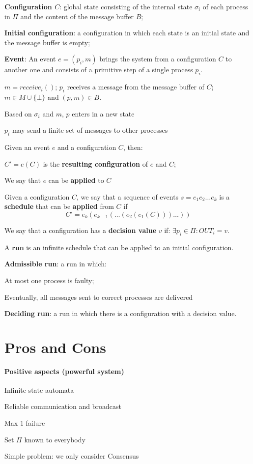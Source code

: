 \documentclass[12pt]{article}
\newcommand{\OUT}{\mathit{OUT}}
\newcommand{\receive}{\mathit{receive}}
\begin{document}
\BI
\item {\bf Configuration $C$}: global state consisting of the internal state $\sigma_i$ of each 
  process in $\Pi$ and the content of the message buffer $B$;
\item {\bf Initial configuration}: a configuration in which each state is
  an initial state and the message buffer is empty;
\item {\bf Event}:
  An event $e = (p_i, m)$ brings the system from a configuration $C$ to another one 
  and consists of a primitive step of a single process $p_i$.
  \BI
  \item $m = \receive_i()$; $p_i$ receives a message from the message buffer of $C$; \\
    $m \in M \cup \{ \bot \}$ and $(p,m) \in B$.
  \item Based on $\sigma_i$ and $m$, $p$ enters in a new state
  \item $p_i$ may send a finite set of messages to other processes
  \EI
\item Given an event $e$ and a configuration $C$, then:
  \BI
  \item $C' = e(C)$ is the {\bf resulting configuration} of $e$ and $C$;
  \item We say that $e$ can be {\bf applied} to $C$
  \EI
\item Given a configuration $C$, we say that a sequence of events $s=e_1 e_2 \ldots e_k$ is 
  a {\bf schedule} that can be {\bf applied} from $C$ if 
  \[
    C' = e_k(e_{k-1}(\ldots(e_2(e_1(C)))\ldots))
  \]
\item We say that a configuration has a {\bf decision value} $v$ if:
  $\exists p_i \in \Pi: \OUT_i = v$.
\item A {\bf run} is an infinite schedule that can be applied to an initial configuration.
\item {\bf Admissible run}: a run in which:
  \BI
  \item At most one process is faulty;
  \item Eventually, all messages sent to correct processes are delivered
  \EI
\item {\bf Deciding run}: a run in which there is a configuration with 
  a decision value.
\EI

\section*{Pros and Cons}

\paragraph{Positive aspects (powerful system)}
\BI
\item Infinite state automata
\item Reliable communication and broadcast
\item Max 1 failure
\item Set $\Pi$ known to everybody
\item Simple problem: we only consider Consensus
\EI
\end{document}
